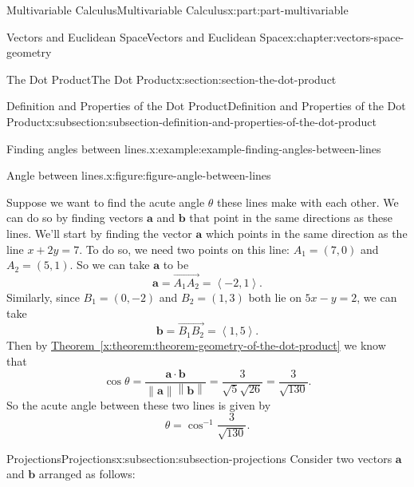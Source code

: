 \documentclass[twoside,10pt,]{book}
\newcommand{\xreffont}{\relax}
\numberwithin{equation}{part}
\newcommand{\norm}[1]{\left\| #1 \right\|}
\newcommand{\dotprod}[1]{\left\langle #1 \right\rangle}
\begin{document}
\begin{partptx}{Multivariable Calculus}{}{Multivariable Calculus}{}{}{x:part:part-multivariable}
\begin{chapterptx}{Vectors and Euclidean Space}{}{Vectors and Euclidean Space}{}{}{x:chapter:vectors-space-geometry}
\begin{sectionptx}{The Dot Product}{}{The Dot Product}{}{}{x:section:section-the-dot-product}
\begin{subsectionptx}{Definition and Properties of the Dot Product}{}{Definition and Properties of the Dot Product}{}{}{x:subsection:subsection-definition-and-properties-of-the-dot-product}
\begin{example}{Finding angles between lines.}{x:example:example-finding-angles-between-lines}
\begin{figureptx}{Angle between lines.}{x:figure:figure-angle-between-lines}{}
\begin{image}{0.1}{0.8}{0.1}
{
}%
\end{image}%
\tcblower
\end{figureptx}%
Suppose we want to find the acute angle \(\theta\) these lines make with each other. We can do so by finding vectors \(\mathbf{a}\) and \(\mathbf{b}\) that point in the same directions as these lines. We'll start by finding the vector \(\mathbf{a}\) which points in the same direction as the line \(x+2y=7\). To do so, we need two points on this line: \(A_{1} = (7,0)\) and \(A_{2} = (5,1)\). So we can take \(\mathbf{a}\) to be%
%
\begin{equation*}
\mathbf{a} = \overrightarrow{A_{1}A_{2}} = \dotprod{-2,1}.
\end{equation*}
Similarly, since \(B_{1} = (0,-2)\) and \(B_{2} = (1,3)\) both lie on \(5x-y = 2\), we can take%
%
\begin{equation*}
\mathbf{b} = \overrightarrow{B_{1}B_{2}} = \dotprod{1,5}.
\end{equation*}
Then by \hyperref[x:theorem:theorem-geometry-of-the-dot-product]{Theorem~{\xreffont\ref{x:theorem:theorem-geometry-of-the-dot-product}}} we know that%
%
\begin{equation*}
\cos\theta = \frac{\mathbf{a}\cdot\mathbf{b}}{\norm{\mathbf{a}}\norm{\mathbf{b}}} = \frac{3}{\sqrt{5}\sqrt{26}} = \frac{3}{\sqrt{130}}.
\end{equation*}
So the acute angle between these two lines is given by%
%
\begin{equation*}
\theta = \cos^{-1}\frac{3}{\sqrt{130}}.
\end{equation*}
\end{example}
\end{subsectionptx}
%
%
\typeout{************************************************}
\typeout{************************************************}
%
\begin{subsectionptx}{Projections}{}{Projections}{}{}{x:subsection:subsection-projections}
Consider two vectors \(\mathbf{a}\) and \(\mathbf{b}\) arranged as follows:%

\end{subsectionptx}
\end{sectionptx}
\end{chapterptx}
\end{partptx}
\end{document}
